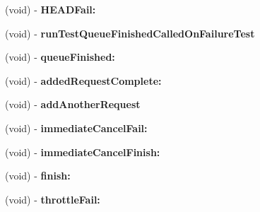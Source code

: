\begin{DoxyCompactItemize}
\item 
\hypertarget{interface_a_s_i_network_queue_tests_07_08_abebd73c6087a317cf7d40a0694fa0554}{
(void) -\/ {\bfseries \-H\-E\-A\-D\-Fail\-:}}
\label{interface_a_s_i_network_queue_tests_07_08_abebd73c6087a317cf7d40a0694fa0554}

\item 
\hypertarget{interface_a_s_i_network_queue_tests_07_08_a863286b45c212a9aff1fd8c9415e8eb8}{
(void) -\/ {\bfseries run\-Test\-Queue\-Finished\-Called\-On\-Failure\-Test}}
\label{interface_a_s_i_network_queue_tests_07_08_a863286b45c212a9aff1fd8c9415e8eb8}

\item 
\hypertarget{interface_a_s_i_network_queue_tests_07_08_a7d969cf7beaae41da4ec7ee5d2f524d4}{
(void) -\/ {\bfseries queue\-Finished\-:}}
\label{interface_a_s_i_network_queue_tests_07_08_a7d969cf7beaae41da4ec7ee5d2f524d4}

\item 
\hypertarget{interface_a_s_i_network_queue_tests_07_08_ab8add5e0479640989a141e56dfcf046a}{
(void) -\/ {\bfseries added\-Request\-Complete\-:}}
\label{interface_a_s_i_network_queue_tests_07_08_ab8add5e0479640989a141e56dfcf046a}

\item 
\hypertarget{interface_a_s_i_network_queue_tests_07_08_a7f9925729daa7cce26bd2301d1b86c2b}{
(void) -\/ {\bfseries add\-Another\-Request}}
\label{interface_a_s_i_network_queue_tests_07_08_a7f9925729daa7cce26bd2301d1b86c2b}

\item 
\hypertarget{interface_a_s_i_network_queue_tests_07_08_ab7c057d1956cb3bda4f21d43260ee1a7}{
(void) -\/ {\bfseries immediate\-Cancel\-Fail\-:}}
\label{interface_a_s_i_network_queue_tests_07_08_ab7c057d1956cb3bda4f21d43260ee1a7}

\item 
\hypertarget{interface_a_s_i_network_queue_tests_07_08_a7d6d1e74ed81581f13c7fa469a78154d}{
(void) -\/ {\bfseries immediate\-Cancel\-Finish\-:}}
\label{interface_a_s_i_network_queue_tests_07_08_a7d6d1e74ed81581f13c7fa469a78154d}

\item 
\hypertarget{interface_a_s_i_network_queue_tests_07_08_a3749253f9e2a43e19ff634c691a289b2}{
(void) -\/ {\bfseries finish\-:}}
\label{interface_a_s_i_network_queue_tests_07_08_a3749253f9e2a43e19ff634c691a289b2}

\item 
\hypertarget{interface_a_s_i_network_queue_tests_07_08_a9afb7d6be102c887541d6bb8c1a85d25}{
(void) -\/ {\bfseries throttle\-Fail\-:}}
\label{interface_a_s_i_network_queue_tests_07_08_a9afb7d6be102c887541d6bb8c1a85d25}


\end{DoxyCompactItemize}
